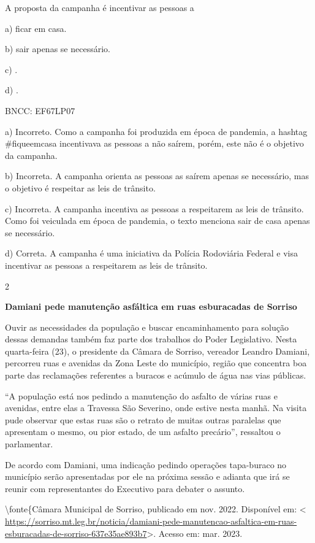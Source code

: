 A proposta da campanha é incentivar as pessoas a

a) ficar em casa.

b) sair apenas se necessário.

c) .

d) .

BNCC: EF67LP07

a) Incorreto. Como a campanha foi produzida em época de pandemia, a
hashtag \#fiqueemcasa incentivava as pessoas a não saírem, porém, este
não é o objetivo da campanha.

b) Incorreta. A campanha orienta as pessoas as saírem apenas se
necessário, mas o objetivo é respeitar as leis de trânsito.

c) Incorreta. A campanha incentiva as pessoas a respeitarem as leis de
trânsito. Como foi veiculada em época de pandemia, o texto menciona sair
de casa apenas se necessário.

d) Correta. A campanha é uma iniciativa da Polícia Rodoviária Federal e
visa incentivar as pessoas a respeitarem as leis de trânsito.

\num{2}

\textbf{Damiani pede manutenção asfáltica em ruas esburacadas de
Sorriso}

Ouvir as necessidades da população e buscar encaminhamento para solução
dessas demandas também faz parte dos trabalhos do Poder Legislativo.
Nesta quarta-feira (23), o presidente da Câmara de Sorriso, vereador
Leandro Damiani, percorreu ruas e avenidas da Zona Leste do município,
região que concentra boa parte das reclamações referentes a buracos e
acúmulo de água nas vias públicas.

``A população está nos pedindo a manutenção do asfalto de várias ruas e
avenidas, entre elas a Travessa São Severino, onde estive nesta manhã.
Na visita pude observar que estas ruas são o retrato de muitas outras
paralelas que apresentam o mesmo, ou pior estado, de um asfalto
precário'', ressaltou o parlamentar.

De acordo com Damiani, uma indicação pedindo operações tapa-buraco no
município serão apresentadas por ele na próxima sessão e adianta que irá
se reunir com representantes do Executivo para debater o assunto.

\textbackslash fonte\{Câmara Municipal de Sorriso, publicado em nov.
2022. Disponível em: \textless{}
\url{https://sorriso.mt.leg.br/noticia/damiani-pede-manutencao-asfaltica-em-ruas-esburacadas-de-sorriso-637e35ae893b7}\textgreater.
Acesso em: mar. 2023.

